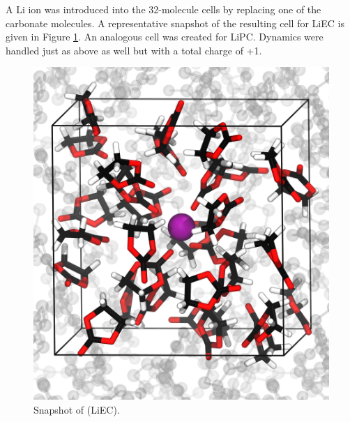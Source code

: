 \begin{ecpc}
    A Li\sur{+} ion was introduced into the 32-molecule cells by replacing one of the carbonate molecules. A representative snapshot of the 
    resulting cell for Li\sur{+}EC is given in Figure \ref{fig:liec_snap}. An analogous cell was created for Li\sur{+}PC.
    Dynamics were handled just as above as well but with a total charge of +1.

\begin{figure}
 \includegraphics[width=0.98\linewidth]{images/ecpc/toc_liec_default.png}
 \caption[Snapshot of (Li\sur{+}EC)]{\label{fig:liec_snap}Snapshot of (Li\sur{+}EC).}
\end{figure}


\end{ecpc}
